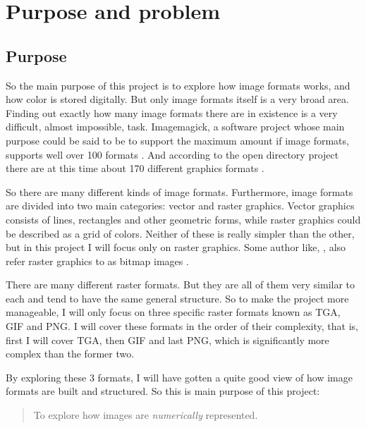 \begin{comment}
  
\end{comment}

\chapter{Purpose and problem}

\section{Purpose}

So the main purpose of this project is to explore how image formats
works, and how color is stored digitally. But only image formats
itself is a very broad area. Finding out exactly how many image
formats there are in existence is a very difficult, almost impossible,
task. Imagemagick, a software project whose main purpose could be said
to be to support the maximum amount if image formats, supports well
over 100 formats \cite{11:imagemagick_home}. And according to the open
directory project there are at this time about 170 different graphics
formats \cite{10:opendirectory_data_formats}.

So there are many different kinds of image formats. Furthermore, image
formats are divided into two main categories: vector and raster
graphics. Vector graphics consists of lines, rectangles and other
geometric forms, while raster graphics could be described as a grid of
colors. Neither of these is really simpler than the other, but in this
project I will focus only on raster graphics. Some author like,
\cite{murray1996encyclopedia}, also refer raster graphics to as bitmap
images \cite{murray1996encyclopedia,roelofs99:_png}.

There are many different raster formats. But they are all of them very
similar to each and tend to have the same general structure. So to
make the project more manageable, I will only focus on three specific
raster formats known as TGA, GIF and PNG. I will cover these formats
in the order of their complexity, that is, first I will cover TGA,
then GIF and last PNG, which is significantly more complex than the
former two.

By exploring these 3 formats, I will have gotten a quite good view of
how image formats are built and structured. So this is main purpose of
this project:

\begin{quote}
  To explore how images are \textit{numerically} represented.
\end{quote}